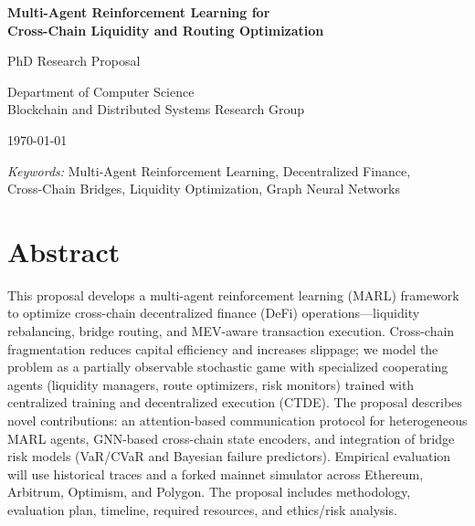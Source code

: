 \documentclass[11pt,a4paper]{article}
\begin{document}
\begin{titlepage}
\centering
\vspace*{2cm}

{\LARGE\bfseries Multi-Agent Reinforcement Learning for\\[0.3cm] Cross-Chain Liquidity and Routing Optimization\par}

\vspace{1.5cm}

{\large PhD Research Proposal\par}

\vspace{2cm}

{\large Department of Computer Science\\[0.2cm]
Blockchain and Distributed Systems Research Group\par}

\vspace{1cm}

{\large \today\par}

\vfill

{\small\textit{Keywords:} Multi-Agent Reinforcement Learning, Decentralized Finance,\\
Cross-Chain Bridges, Liquidity Optimization, Graph Neural Networks}

\end{titlepage}

\section*{Abstract}

This proposal develops a multi-agent reinforcement learning (MARL) framework to optimize cross-chain decentralized finance (DeFi) operations---liquidity rebalancing, bridge routing, and MEV-aware transaction execution. Cross-chain fragmentation reduces capital efficiency and increases slippage; we model the problem as a partially observable stochastic game with specialized cooperating agents (liquidity managers, route optimizers, risk monitors) trained with centralized training and decentralized execution (CTDE). The proposal describes novel contributions: an attention-based communication protocol for heterogeneous MARL agents, GNN-based cross-chain state encoders, and integration of bridge risk models (VaR/CVaR and Bayesian failure predictors). Empirical evaluation will use historical traces and a forked mainnet simulator across Ethereum, Arbitrum, Optimism, and Polygon. The proposal includes methodology, evaluation plan, timeline, required resources, and ethics/risk analysis.
\end{document}
